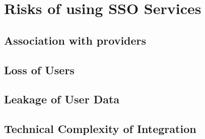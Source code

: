 \newpage

\section{Risks of using \ac{SSO} Services}

\subsection{Association with providers}

\subsection{Loss of Users}

\subsection{Leakage of User Data}

\subsection{Technical Complexity of Integration}